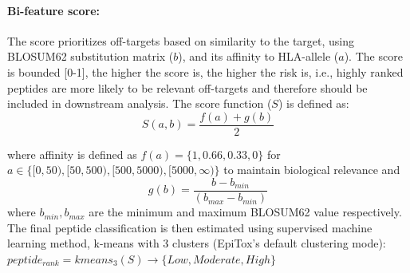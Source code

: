 \documentclass[times, twoside, watermark]{zHenriquesLab-StyleBioRxiv}
\begin{document}
        \paragraph{Bi-feature score:}\label{methods:bi_feature} 
            The score prioritizes off-targets based on similarity to the target, using BLOSUM62 substitution matrix ($b$), and its affinity to HLA-allele ($a$). The score is bounded [0-1], the higher the score is, the higher the risk is, i.e., highly ranked peptides are more likely to be relevant off-targets and therefore should be included in downstream analysis. The score function ($S$) is defined as:
            \begin{equation}
                S(a,b)=  \frac{f(a)+g(b)}{2}
            \end{equation}

            where affinity is defined as 
            $f(a)= \{1,0.66,0.33,0\}$ for 
            $a \in \{[0,50),[50,500),[500,5000),[5000,\infty)\}$ to maintain biological relevance and
            \begin{equation}
                g(b)=  \frac{b- b_{min}}{(b_{max}-b_{min})} 
            \end{equation}
            where $b_{min},b_{max}$ are the minimum and maximum BLOSUM62 value respectively.
            The final peptide classification is then estimated using supervised machine learning method, k-means with 3 clusters (EpiTox’s default clustering mode): $peptide_{rank}= kmeans_3(S) \rightarrow\{Low,Moderate,High\}$
            
\end{document}
